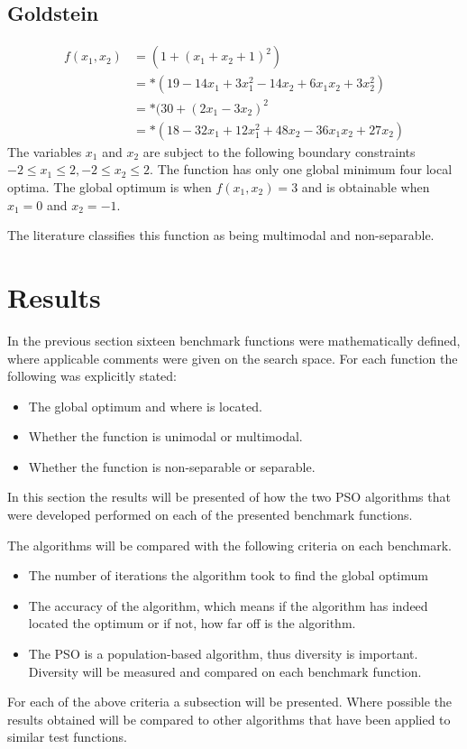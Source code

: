 \subsection{Goldstein}
\begin{align}
	f(x_1,x_2) &= (1 + (x_1 + x_2 + 1)^2)\nonumber\\
			   &=*(19-14x_1+3x_1^2 -14x_2 + 6x_1x_2 + 3x_2^2)\nonumber\\
			   &=*(30 + (2x_1 -3x_2)^2\nonumber\\
			   &=*(18 - 32x_1 + 12x_1^2 +48x_2 -36x_1x_2 + 27x_2)\nonumber
\end{align}
The variables $x_1$ and $x_2$ are subject to the following boundary constraints $-2 \leq x_1 \leq 2, -2 \leq x_2 \leq 2$\cite{ABCCompareStudy,TSGlobalOptimization,TSGlobalOptContinFunc,ContinACSTS,TestFunctions}. The function has only one global minimum four local optima\cite{ABCCompareStudy,TSGlobalOptimization}. The global optimum is when $f(x_1,x_2) = 3$ and is obtainable when $x_1 = 0$ and $x_2 = -1$\cite{ABCCompareStudy,TSGlobalOptimization,TSGlobalOptContinFunc,ContinACSTS,TestFunctions}.

The literature classifies this function as being multimodal and non-separable\cite{ABCCompareStudy}.

\section{Results}
\label{sec:benchResults}
In the previous section sixteen benchmark functions were mathematically defined, where applicable comments were given on the search space. For each function the following was explicitly stated:
\begin{itemize}
\item The global optimum and where is located.
\item Whether the function is unimodal or multimodal.
\item Whether the function is non-separable or separable.
\end{itemize}
In this section the results will be presented of how the two PSO algorithms that were developed performed on each of the presented benchmark functions. 

The algorithms will be compared with the following criteria on each benchmark.
\begin{itemize}
\item The number of iterations the algorithm took to find the global optimum
\item The accuracy of the algorithm, which means if the algorithm has indeed located the optimum or if not, how far off is the algorithm.
\item The PSO is a population-based algorithm, thus diversity is important. Diversity will be measured and compared on each benchmark function.
\end{itemize}
For each of the above criteria a subsection will be presented. Where possible the results obtained will be compared to other algorithms that have been applied to similar test functions.

